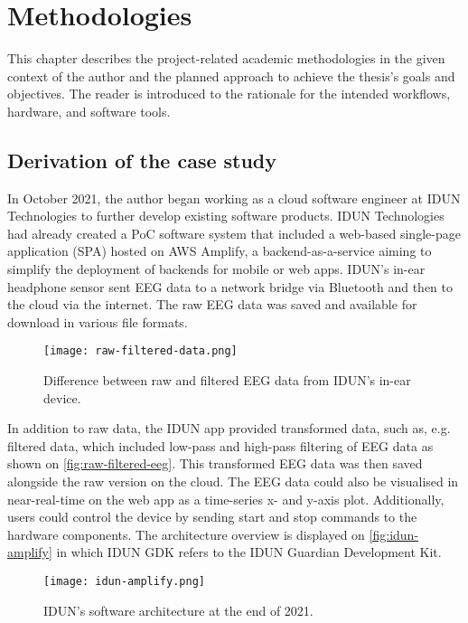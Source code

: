 \chapter{Methodologies}
\graphicspath{{Chapter3/Figs/}{Chapter3/Figs/}}

This chapter describes the project-related academic methodologies in the given context of the author and the planned approach to achieve the thesis's goals and objectives. The reader is introduced to the rationale for the intended workflows, hardware, and software tools.

\section{Derivation of the case study}
\label{chapter3-derivation-of-the-case-study}

In October 2021, the author began working as a cloud software engineer at IDUN Technologies to further develop existing software products. IDUN Technologies had already created a PoC software system that included a web-based single-page application (SPA) hosted on AWS Amplify, a backend-as-a-service aiming to simplify the deployment of backends for mobile or web apps. IDUN's in-ear headphone sensor sent EEG data to a network bridge via Bluetooth and then to the cloud via the internet. The raw EEG data was saved and available for download in various file formats.

\begin{figure}[!ht]
  \centering
  \texttt{[image: raw-filtered-data.png]}
  \caption{Difference between raw and filtered EEG data from IDUN's in-ear device.}
  \label{fig:raw-filtered-eeg}
\end{figure}

In addition to raw data, the IDUN app provided transformed data, such as, e.g. filtered data, which included low-pass and high-pass filtering of EEG data as shown on \autoref{fig:raw-filtered-eeg}. This transformed EEG data was then saved alongside the raw version on the cloud. The EEG data could also be visualised in near-real-time on the web app as a time-series x- and y-axis plot. Additionally, users could control the device by sending start and stop commands to the hardware components. The architecture overview is displayed on \autoref{fig:idun-amplify} in which IDUN GDK refers to the IDUN Guardian Development Kit.

\begin{figure}[!ht]
  \centering
  \texttt{[image: idun-amplify.png]}
  \caption{IDUN's software architecture at the end of 2021.}
  \label{fig:idun-amplify}
\end{figure}


